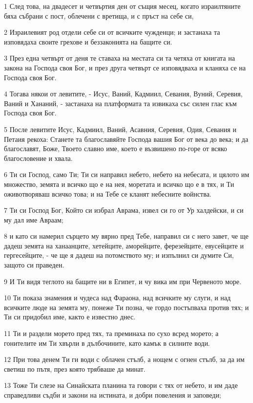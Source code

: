\par 1 След това, на двадесет и четвъртия ден от същия месец, когато израилтяните бяха събрани с пост, облечени с вретища, и с пръст на себе си,
\par 2 Израилевият род отдели себе си от всичките чужденци; и застанаха та изповядаха своите грехове и беззаконията на бащите си.
\par 3 През една четвърт от деня те ставаха на местата си та четяха от книгата на закона на Господа своя Бог, и през друга четвърт се изповядваха и кланяха се на Господа своя Бог.
\par 4 Тогава някои от левитите, - Исус, Ваний, Кадмиил, Севания, Вуний, Серевия, Ваний и Хананий, - застанаха на платформата та извикаха със силен глас към Господа своя Бог.
\par 5 После левитите Исус, Кадмиил, Ваний, Асавния, Серевия, Одия, Севания и Петаия рекоха: Станете та благославяйте Господа вашия Бог от века до века; и да благославят, Боже, Твоето славно име, което е възвишено по-горе от всяко благословение и хвала.
\par 6 Ти си Господ, само Ти; Ти си направил небето, небето на небесата, и цялото им множество, земята и всичко що е на нея, моретата и всичко що е в тях, и Ти оживотворяваш всичко това; и на Тебе се кланят небесните войнства.
\par 7 Ти си Господ Бог, Който си избрал Аврама, извел си го от Ур халдейски, и си му дал име Авраам;
\par 8 и като си намерил сърцето му вярно пред Тебе, направил си с него завет, че ще дадеш земята на ханаанците, хетейците, аморейците, ферезейците, евусейците и гергесейците, - че ще я дадеш на потомството му; и изпълнил си думите Си, защото си праведен.
\par 9 И Ти видя теглото на бащите ни в Египет, и чу вика им при Червеното море.
\par 10 Ти показа знамения и чудеса над Фараона, над всичките му слуги, и над всичките люде на земята му, понеже Ти позна, че гордо постъпваха против тях; и Ти си придобил име, както е известно днес.
\par 11 Ти и раздели морето пред тях, та преминаха по сухо всред морето; а гонителите им Ти хвърли в дълбочините, като камък в силните води.
\par 12 При това денем Ти ги води с облачен стълб, а нощем с огнен стълб, за да им светиш по пътя, през която трябваше да минат.
\par 13 Тоже Ти слезе на Синайската планина та говори с тях от небето, и им даде справедливи съдби и закони на истината, и добри повеления и заповеди;
